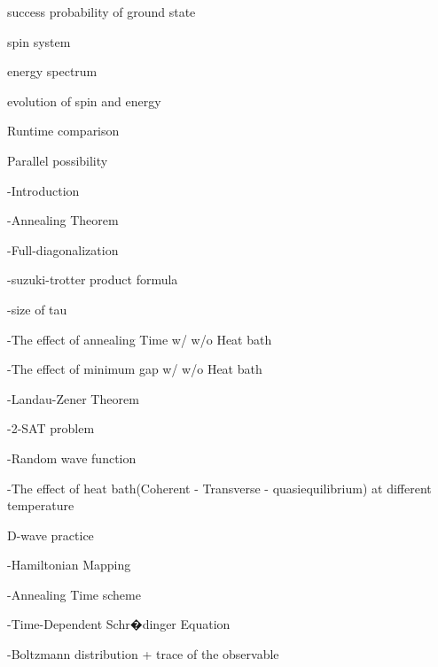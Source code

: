 \documentclass[twoside,a4paper,article]{combine}
\begin{document}
success probability of ground state

spin system

energy spectrum

evolution of spin and energy

Runtime comparison

Parallel possibility

-Introduction

-Annealing Theorem

-Full-diagonalization

-suzuki-trotter product formula

-size of tau

-The effect of annealing Time w/ w/o Heat bath

-The effect of minimum gap w/ w/o Heat bath

-Landau-Zener Theorem

-2-SAT problem 

-Random wave function  

-The effect of heat bath(Coherent - Transverse - quasiequilibrium) at different temperature

D-wave practice

-Hamiltonian Mapping

-Annealing Time scheme

-Time-Dependent Schr�dinger Equation

-Boltzmann distribution + trace of the observable






\end{document}
